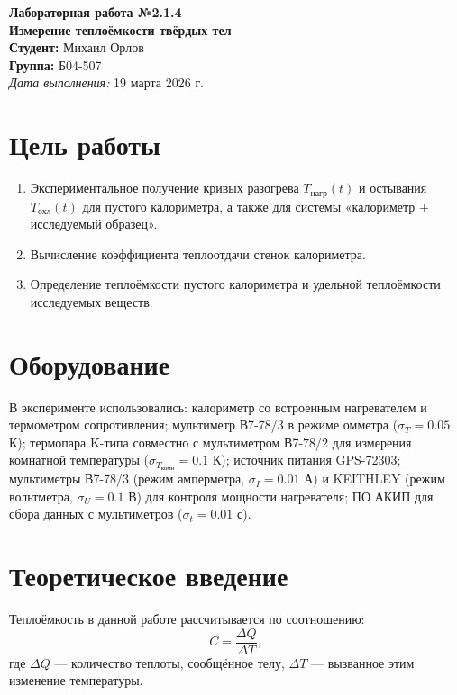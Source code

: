 \documentclass[a4paper,12pt]{article}
\begin{document}
\begin{center}
    {\Large \textbf{Лабораторная работа №2.1.4}} \\
    \vspace{0.3cm}
    {\Large \textbf{Измерение теплоёмкости твёрдых тел}} \\
    \vspace{0.5cm}
    \textbf{Студент:} Михаил Орлов \\
    \textbf{Группа:} Б04-507 \\
    \textit{Дата выполнения:} 19 марта 2026 г.
\end{center}

\section*{Цель работы}
\begin{enumerate}
    \item Экспериментальное получение кривых разогрева $T_{\text{нагр}}(t)$ и остывания $T_{\text{охл}}(t)$ для пустого калориметра, а также для системы «калориметр + исследуемый образец».
    \item Вычисление коэффициента теплоотдачи стенок калориметра.
    \item Определение теплоёмкости пустого калориметра и удельной теплоёмкости исследуемых веществ.
\end{enumerate}

\section*{Оборудование}
В эксперименте использовались: калориметр со встроенным нагревателем и термометром сопротивления; мультиметр В7-78/3 в режиме омметра ($\sigma_T = 0.05$ К); термопара K-типа совместно с мультиметром В7-78/2 для измерения комнатной температуры ($\sigma_{T_{\text{комн}}} = 0.1$ К); источник питания GPS-72303; мультиметры В7-78/3 (режим амперметра, $\sigma_I = 0.01$ А) и KEITHLEY (режим вольтметра, $\sigma_U = 0.1$ В) для контроля мощности нагревателя; ПО АКИП для сбора данных с мультиметров ($\sigma_t = 0.01$ с).

\section{Теоретическое введение}
Теплоёмкость в данной работе рассчитывается по соотношению:
\begin{equation}
    C = \frac{\Delta Q}{\Delta T},
    \label{eq:def}
\end{equation}
где $\Delta Q$ — количество теплоты, сообщённое телу, $\Delta T$ — вызванное этим изменение температуры.
\end{document}
